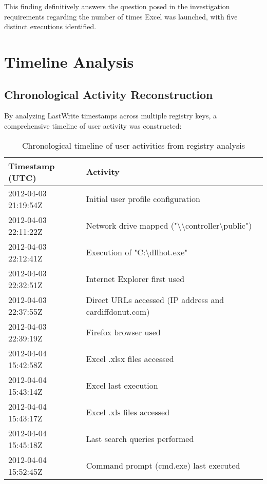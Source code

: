 This finding definitively answers the question posed in the investigation requirements regarding the number of times Excel was launched, with five distinct executions identified.

\section{Timeline Analysis}
\subsection{Chronological Activity Reconstruction}
By analyzing LastWrite timestamps across multiple registry keys, a comprehensive timeline of user activity was constructed:

\begin{table}[htbp]
    \centering
    \begin{tabular}{|p{4cm}|p{9cm}|}
        \hline
        \textbf{Timestamp (UTC)} & \textbf{Activity} \\
        \hline
        2012-04-03 21:19:54Z & Initial user profile configuration \\
        \hline
        2012-04-03 22:11:22Z & Network drive mapped ("\textbackslash\textbackslash controller\textbackslash public") \\
        \hline
        2012-04-03 22:12:41Z & Execution of "C:\textbackslash dllhot.exe" \\
        \hline
        2012-04-03 22:32:51Z & Internet Explorer first used \\
        \hline
        2012-04-03 22:37:55Z & Direct URLs accessed (IP address and cardiffdonut.com) \\
        \hline
        2012-04-03 22:39:19Z & Firefox browser used \\
        \hline
        2012-04-04 15:42:58Z & Excel .xlsx files accessed \\
        \hline
        2012-04-04 15:43:14Z & Excel last execution \\
        \hline
        2012-04-04 15:43:17Z & Excel .xls files accessed \\
        \hline
        2012-04-04 15:45:18Z & Last search queries performed \\
        \hline
        2012-04-04 15:52:45Z & Command prompt (cmd.exe) last executed \\
        \hline
    \end{tabular}
    \caption{Chronological timeline of user activities from registry analysis}
    \label{tab:activity_timeline}
\end{table}

